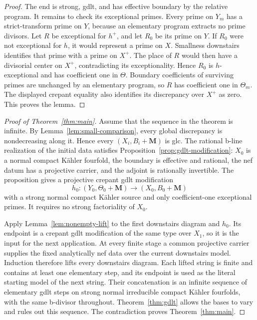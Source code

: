 \documentclass[11pt]{amsart}
\theoremstyle{definition}
\theoremstyle{remark}
\numberwithin{equation}{section}
\newcommand{\M}{\mathbf{M}}
\begin{document}
\begin{proof}
The end is strong, gdlt, and has effective boundary by the relative
program.  It remains to check its exceptional primes.  Every prime on
\(Y_m\) has a strict-transform prime on \(Y\), because an elementary
program extracts no prime divisors.  Let \(R\) be exceptional for
\(h^+\), and let \(R_0\) be its prime on \(Y\).  If \(R_0\) were not
exceptional for \(h\), it would represent a prime on \(X\).  Smallness
downstairs identifies that prime with a prime on \(X^+\).  The place of
\(R\) would then have a divisorial center on \(X^+\), contradicting its
exceptionality.  Hence \(R_0\) is \(h\)-exceptional and has coefficient
one in \(\Theta\).  Boundary coefficients of surviving primes are
unchanged by an elementary program, so \(R\) has coefficient one in
\(\Theta_m\).  The displayed crepant equality also identifies its
discrepancy over \(X^+\) as zero.  This proves the lemma.
\end{proof}

\begin{proof}[Proof of Theorem~\ref{thm:main}]
Assume that the sequence in the theorem is infinite.  By
Lemma~\ref{lem:small-comparison}, every global discrepancy is nondecreasing
along it.  Hence every \((X_i,B_i+\M)\) is glc.  The rational b-line
realization of the initial data satisfies
Proposition~\ref{prop:gdlt-modification}: \(X_0\) is a normal compact
K\"ahler fourfold, the boundary is effective and rational, the nef datum
has a projective carrier, and the adjoint is rationally invertible.  The
proposition gives a projective crepant gdlt modification
\[
 h_0:(Y_0,\Theta_0+\M)\longrightarrow(X_0,B_0+\M)
\]
with a strong normal compact K\"ahler source and only coefficient-one
exceptional primes.  It requires no strong factoriality of \(X_0\).

Apply Lemma~\ref{lem:nonempty-lift} to the first downstairs diagram and
\(h_0\).  Its endpoint is a crepant gdlt modification of the same type over
\(X_1\), so it is the input for the next application.  At every finite
stage a common projective carrier supplies the fixed analytically nef
data over the current downstairs model.  Induction therefore lifts every
downstairs diagram.  Each lifted string is finite and contains at least one
elementary step, and its endpoint is used as the literal starting model of
the next string.  Their concatenation is an infinite sequence of elementary
gdlt steps on strong normal irreducible compact K\"ahler fourfolds, with the same
b-divisor throughout.  Theorem~\ref{thm:gdlt} allows the bases to vary and
rules out this sequence.  The contradiction proves
Theorem~\ref{thm:main}.
\end{proof}
\end{document}
